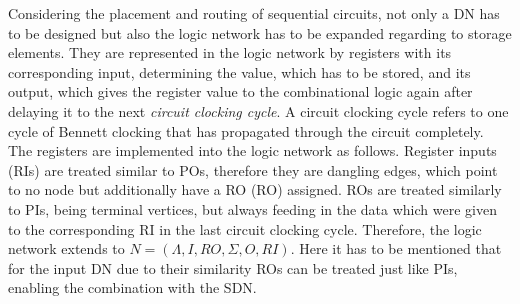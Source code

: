Considering the placement and routing of sequential circuits, not only a DN has to be designed but also the logic network has to be expanded regarding to storage elements. They are represented in the logic network by registers with its corresponding input, determining the value, which has to be stored, and its output, which gives the register value to the combinational logic again after delaying it to the next \textit{circuit clocking cycle}. A circuit clocking cycle refers to one cycle of Bennett clocking that has propagated through the circuit completely. The registers are implemented into the logic network as follows. Register inputs (RIs) are treated similar to POs, therefore they are dangling edges, which point to no node but additionally have a RO (RO) assigned. ROs are treated similarly to PIs, being terminal vertices, but always feeding in the data which were given to the corresponding RI in the last circuit clocking cycle. Therefore, the logic network extends to $N = (\Lambda, I, RO, \Sigma, O, RI)$. Here it has to be mentioned that for the input DN due to their similarity ROs can be treated just like PIs, enabling the combination with the SDN.

